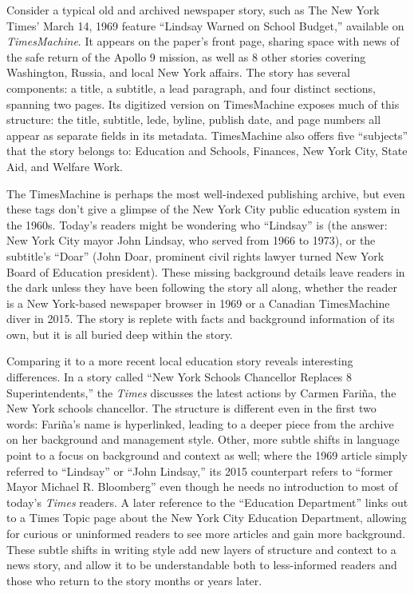 Consider a typical old and archived newspaper story, such as The New York Times' March 14, 1969 feature ``Lindsay Warned on School Budget,'' available on \emph{TimesMachine}. It appears on the paper's front page, sharing space with news of the safe return of the Apollo 9 mission, as well as 8 other stories covering Washington, Russia, and local New York affairs. The story has several components: a title, a subtitle, a lead paragraph, and four distinct sections, spanning two pages. Its digitized version on TimesMachine exposes much of this structure: the title, subtitle, lede, byline, publish date, and page numbers all appear as separate fields in its metadata. TimesMachine also offers five ``subjects'' that the story belongs to: Education and Schools, Finances, New York City, State Aid, and Welfare Work.\autocite{bennett_lindsay_1969}

The TimesMachine is perhaps the most well-indexed publishing archive, but even these tags don't give a glimpse of the New York City public education system in the 1960s. Today's readers might be wondering who ``Lindsay'' is (the answer: New York City mayor John Lindsay, who served from 1966 to 1973), or the subtitle's ``Doar'' (John Doar, prominent civil rights lawyer turned New York Board of Education president). These missing background details leave readers in the dark unless they have been following the story all along, whether the reader is a New York-based newspaper browser in 1969 or a Canadian TimesMachine diver in 2015. The story is replete with facts and background information of its own, but it is all buried deep within the story.

Comparing it to a more recent local education story reveals interesting differences. In a story called ``New York Schools Chancellor Replaces 8 Superintendents,'' the \emph{Times} discusses the latest actions by Carmen Fari\~{n}a, the New York schools chancellor.\autocite{taylor_new_2014} The structure is different even in the first two words: Fari\~{n}a's name is hyperlinked, leading to a deeper piece from the archive on her background and management style. Other, more subtle shifts in language point to a focus on background and context as well; where the 1969 article simply referred to ``Lindsay'' or ``John Lindsay,'' its 2015 counterpart refers to ``former Mayor Michael R. Bloomberg'' even though he needs no introduction to most of today's \emph{Times} readers. A later reference to the ``Education Department'' links out to a Times Topic page about the New York City Education Department, allowing for curious or uninformed readers to see more articles and gain more background. These subtle shifts in writing style add new layers of structure and context to a news story, and allow it to be understandable both to less-informed readers and those who return to the story months or years later.

